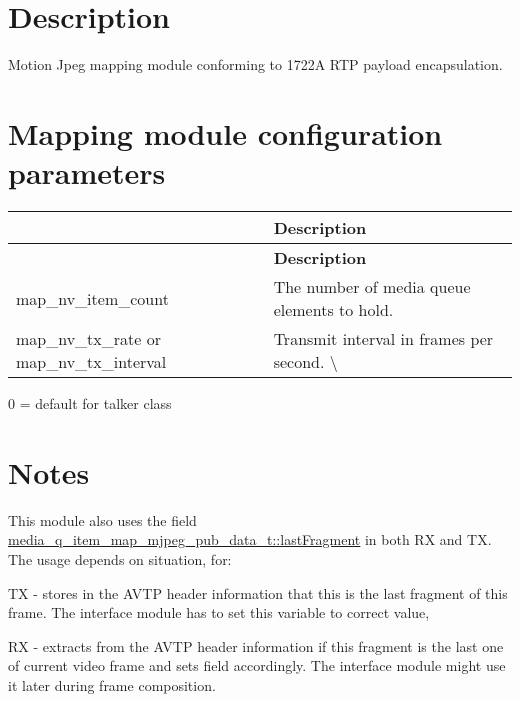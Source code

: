 \section*{Description}

Motion Jpeg mapping module conforming to 1722A R\+TP payload encapsulation.

\section*{Mapping module configuration parameters}

\tabulinesep=1mm
\begin{longtabu} spread 0pt [c]{*2{|X[-1]}|}
\hline
{}&{\bf Description  }\\
\endfirsthead
\hline
\endfoot
\hline
{}&{\bf Description  }\\
\endhead
map\+\_\+nv\+\_\+item\+\_\+count &The number of media queue elements to hold. \\
map\+\_\+nv\+\_\+tx\+\_\+rate or map\+\_\+nv\+\_\+tx\+\_\+interval &Transmit interval in frames per second. \textbackslash{} \\
\end{longtabu}
0 = default for talker class

\section*{Notes}

This module also uses the field \hyperlink{structmedia__q__item__map__mjpeg__pub__data__t_a1db3399abba4fe879f482e7b6b144ace}{media\+\_\+q\+\_\+item\+\_\+map\+\_\+mjpeg\+\_\+pub\+\_\+data\+\_\+t\+::last\+Fragment} in both RX and TX. The usage depends on situation, for\+:
\begin{DoxyItemize}
\item TX -\/ stores in the A\+V\+TP header information that this is the last fragment of this frame. The interface module has to set this variable to correct value,
\item RX -\/ extracts from the A\+V\+TP header information if this fragment is the last one of current video frame and sets field accordingly. The interface module might use it later during frame composition. 
\end{DoxyItemize}